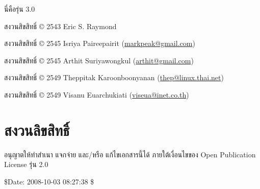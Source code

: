 
\pagestyle{plain}

\maketitle

\noindent นี่คือรุ่น 3.0

\noindent สงวนสิขสิทธิ์ © 2543 Eric S. Raymond

\noindent สงวนสิขสิทธิ์ © 2545 Isriya Paireepairit (\href{mailto:markpeak@gmail.com}{markpeak@gmail.com})

\noindent สงวนสิขสิทธิ์ © 2545 Arthit Suriyawongkul (\href{mailto:arthit@gmail.com}{arthit@gmail.com})

\noindent สงวนสิขสิทธิ์ © 2549 Theppitak Karoonboonyanan (\href{mailto:arthit@gmail.com}{thep@linux.thai.net})

\noindent สงวนสิขสิทธิ์ © 2549 Visanu Euarchukiati (\href{mailto:arthit@gmail.com}{viseua@inet.co.th})

\section*{สงวนลิขสิทธิ์}

อนุญาตให้ทำสำเนา แจกจ่าย และ/หรือ แก้ไขเอกสารนี้ได้ ภายใต้เงื่อนไขของ
Open Publication License รุ่น 2.0


\noindent \$Date: 2008-10-03 08:27:38 \$

